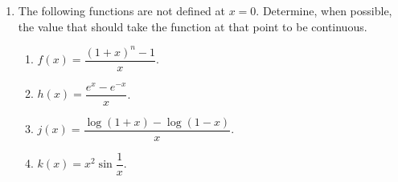\begin{enumerate}[leftmargin=*]
\item The following functions are not defined at $x=0$.
      Determine, when possible, the value that should take the function at that point to be continuous.
      \begin{multicols}{2}
      \begin{enumerate}
      \item $f(x)=\dfrac{(1+x)^n-1}{x}$.
      \item $h(x)=\dfrac{e^x-e^{-x}}{x}$.
      \item $j(x)=\dfrac{\log(1+x)-\log(1-x)}{x}$.
      \item $k(x)=x^2\sin\dfrac{1}{x}$.
      \end{enumerate}
      \end{multicols}

\end{enumerate}
